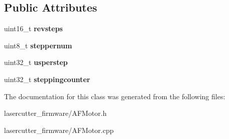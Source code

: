 \subsection*{Public Attributes}
\begin{DoxyCompactItemize}
\item 
uint16\+\_\+t {\bfseries revsteps}\hypertarget{class_a_f___stepper_af7089ce48f8fb238e4d116d8fafbbe29}{}\label{class_a_f___stepper_af7089ce48f8fb238e4d116d8fafbbe29}

\item 
uint8\+\_\+t {\bfseries steppernum}\hypertarget{class_a_f___stepper_adc3d6ad40f191bbc015160159e2491d1}{}\label{class_a_f___stepper_adc3d6ad40f191bbc015160159e2491d1}

\item 
uint32\+\_\+t {\bfseries usperstep}\hypertarget{class_a_f___stepper_aa7a85abed22ecb012b6132ec58d6f39f}{}\label{class_a_f___stepper_aa7a85abed22ecb012b6132ec58d6f39f}

\item 
uint32\+\_\+t {\bfseries steppingcounter}\hypertarget{class_a_f___stepper_a3358fb3eb20b58a5addfd9a5cc863efc}{}\label{class_a_f___stepper_a3358fb3eb20b58a5addfd9a5cc863efc}

\end{DoxyCompactItemize}


The documentation for this class was generated from the following files\+:\begin{DoxyCompactItemize}
\item 
lasercutter\+\_\+firmware/A\+F\+Motor.\+h\item 
lasercutter\+\_\+firmware/A\+F\+Motor.\+cpp\end{DoxyCompactItemize}
